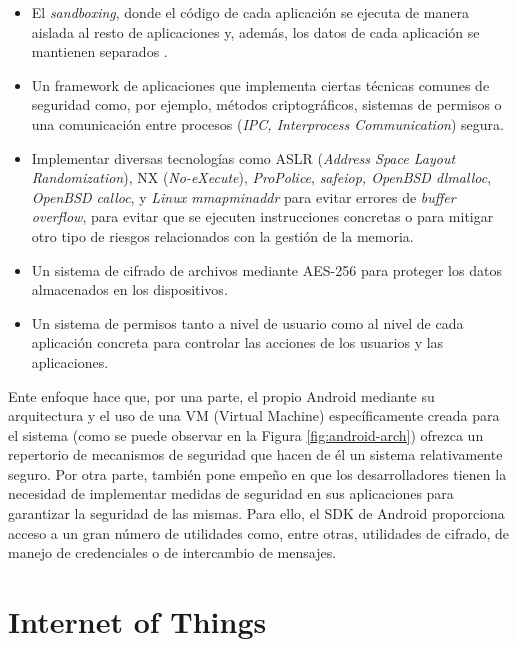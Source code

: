 \begin{itemize}
	\item El \emph{sandboxing}, donde el código de cada aplicación se ejecuta de manera aislada al resto de aplicaciones y, además, los datos de cada aplicación se mantienen separados \cite{jspdcp-2014}. 
	\item Un framework de aplicaciones que implementa ciertas técnicas comunes de seguridad como, por ejemplo, métodos criptográficos, sistemas de permisos o una comunicación entre procesos (\textit{IPC, Interprocess Communication}) segura.	
	\item Implementar diversas tecnologías como ASLR (\textit{Address Space Layout Randomization}), NX (\textit{No-eXecute}), \textit{ProPolice}, \textit{safe\textunderscore iop, OpenBSD dlmalloc}, \textit{OpenBSD calloc}, y \textit{Linux mmap\textunderscore min\textunderscore addr} para evitar errores de \textit{buffer overflow}, para evitar que se ejecuten instrucciones concretas o para mitigar otro tipo de riesgos relacionados con la gestión de la memoria.
	\item Un sistema de cifrado de archivos mediante AES-256 para proteger los datos almacenados en los dispositivos.
	\item Un sistema de permisos tanto a nivel de usuario como al nivel de cada aplicación concreta para controlar las acciones de los usuarios y las aplicaciones.
\end{itemize}

Ente enfoque hace que, por una parte, el propio Android mediante su arquitectura y el uso de una VM (Virtual Machine) específicamente creada para el sistema (como se puede observar en la Figura \ref{fig:android-arch}) ofrezca un repertorio de mecanismos de seguridad que hacen de él un sistema relativamente seguro. Por otra parte, también pone empeño en que los desarrolladores tienen la necesidad de implementar medidas de seguridad en sus aplicaciones para garantizar la seguridad de las mismas. Para ello, el SDK de Android proporciona acceso a un gran número de utilidades como, entre otras, utilidades de cifrado, de manejo de credenciales o de intercambio de mensajes.


\section{Internet of Things}

